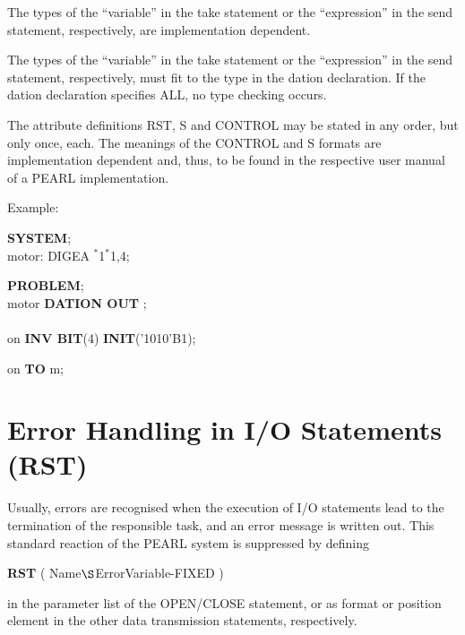 \begin{removed}
The types of the ``variable'' in the take statement or the
``expression'' in the send statement, respectively, are implementation
dependent.
\end{removed}
\begin{accepted}
The types of the ``variable'' in the take statement or the
``expression'' in the send statement, respectively, must fit to 
the type in the dation declaration. If the dation declaration 
specifies ALL, no type checking occurs.
\end{accepted}

\begin{removed}
The attribute definitions RST, S and CONTROL may be stated in any
order, but only once, each. The meanings of the CONTROL and S formats
are implementation dependent and, thus, to be found in the respective
user manual of a PEARL implementation.
\end{removed}

Example:

\begin{removed}
{\bf SYSTEM};\\
\x motor: DIGEA $^*$1$^*$1,4;
\end{removed}

{\bf PROBLEM};\\
 motor {\bf DATION OUT  
     };\\
\x {}\\
 on {\bf INV BIT}(4) {\bf INIT}('1010'B1);

 on {\bf TO} m;

\section{Error Handling in I/O Statements (RST)}    %
\label{sec_dation_rst}

Usually, errors are recognised when the execution of I/O statements lead to the
termination of the responsible task, and an error message is written
out. This standard reaction of the PEARL system is suppressed by
defining

{\bf RST} ( Name$\S $ErrorVariable-FIXED )

in the parameter list of the OPEN/CLOSE statement, or as format or
position element in the other data transmission statements,
respectively.

